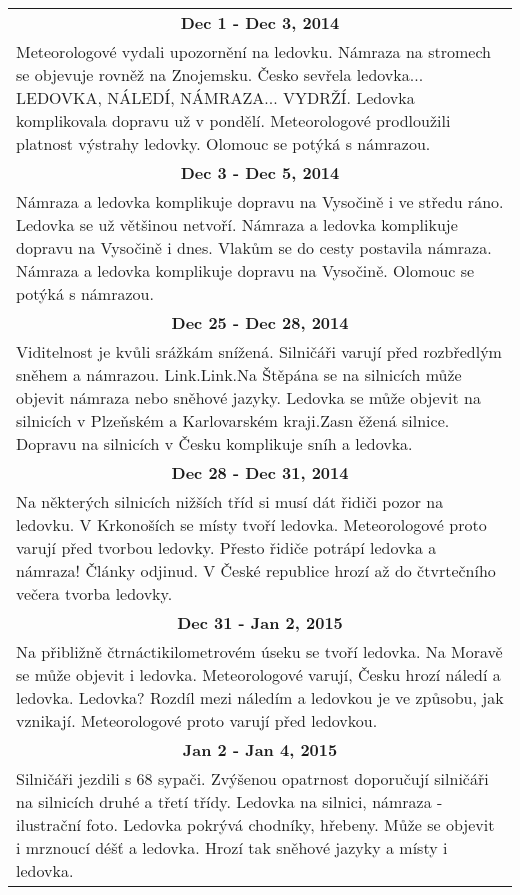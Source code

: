 \begin{tabularx}{\linewidth}{l l}
\multicolumn{2}{c}{\bf Dec 1 - Dec 3, 2014} \\
\multicolumn{2}{p{\linewidth}}{Meteorologové vydali upozornění na ledovku. Námraza na stromech se objevuje rovněž na Znojemsku. Česko sevřela ledovka... LEDOVKA, NÁLEDÍ, NÁMRAZA... VYDRŽÍ. Ledovka komplikovala dopravu už v pondělí. Meteorologové prodloužili platnost výstrahy ledovky. Olomouc se potýká s námrazou.} \\ \midrule
\multicolumn{2}{c}{\bf Dec 3 - Dec 5, 2014} \\
\multicolumn{2}{p{\linewidth}}{Námraza a ledovka komplikuje dopravu na Vysočině i ve středu ráno. Ledovka se už většinou netvoří. Námraza a ledovka komplikuje dopravu na Vysočině i dnes. Vlakům se do cesty postavila námraza. Námraza a ledovka komplikuje dopravu na Vysočině. Olomouc se potýká s námrazou.} \\ \midrule
\multicolumn{2}{c}{\bf Dec 25 - Dec 28, 2014} \\
\multicolumn{2}{p{\linewidth}}{Viditelnost je kvůli srážkám snížená. Silničáři varují před rozbředlým sněhem a námrazou. Link.Link.Na Štěpána se na silnicích může objevit námraza nebo sněhové jazyky. Ledovka se může objevit na silnicích v Plzeňském a Karlovarském kraji.Zasn ěžená silnice. Dopravu na silnicích v Česku komplikuje sníh a ledovka.} \\ \midrule
\multicolumn{2}{c}{\bf Dec 28 - Dec 31, 2014} \\
\multicolumn{2}{p{\linewidth}}{Na některých silnicích nižších tříd si musí dát řidiči pozor na ledovku. V Krkonoších se místy tvoří ledovka. Meteorologové proto varují před tvorbou ledovky. Přesto řidiče potrápí ledovka a námraza! Články odjinud. V České republice hrozí až do čtvrtečního večera tvorba ledovky.} \\ \midrule
\multicolumn{2}{c}{\bf Dec 31 - Jan 2, 2015} \\
\multicolumn{2}{p{\linewidth}}{Na přibližně čtrnáctikilometrovém úseku se tvoří ledovka. Na Moravě se může objevit i ledovka. Meteorologové varují, Česku hrozí náledí a ledovka. Ledovka? Rozdíl mezi náledím a ledovkou je ve způsobu, jak vznikají. Meteorologové proto varují před ledovkou.} \\ \midrule
\multicolumn{2}{c}{\bf Jan 2 - Jan 4, 2015} \\
\multicolumn{2}{p{\linewidth}}{Silničáři jezdili s 68 sypači. Zvýšenou opatrnost doporučují silničáři na silnicích druhé a třetí třídy. Ledovka na silnici, námraza - ilustrační foto. Ledovka pokrývá chodníky, hřebeny. Může se objevit i mrznoucí déšť a ledovka. Hrozí tak sněhové jazyky a místy i ledovka.} \\ \midrule

\end{tabularx}

